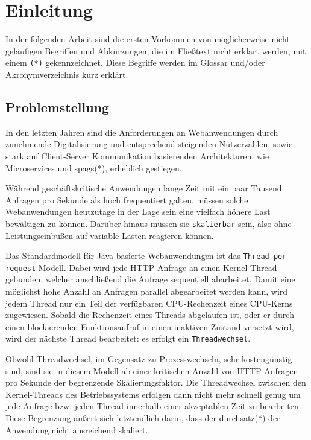 \section{Einleitung}
\label{sec:einleitung}
In der folgenden Arbeit sind die ersten Vorkommen von möglicherweise nicht geläufigen Begriffen und Abkürzungen, die
im Fließtext nicht erklärt werden, mit einem \verb|(*)| gekennzeichnet.
Diese Begriffe werden im Glossar und/oder Akronymverzeichnis kurz erklärt.

\subsection{Problemstellung}
\label{subsec:problemstellung}
In den letzten Jahren sind die Anforderungen an Webanwendungen durch zunehmende Digitalisierung und entsprechend steigenden Nutzerzahlen,
sowie stark auf Client-Server Kommunikation basierenden Architekturen, wie Microservices und \Glspl{spag}(*), erheblich gestiegen.

Während geschäftskritische Anwendungen lange Zeit mit ein paar Tausend Anfragen pro Sekunde als hoch frequentiert
galten, müssen solche Webanwendungen heutzutage in der Lage sein eine vielfach höhere Last bewältigen zu können.
Darüber hinaus müssen sie \verb|skalierbar| sein, also ohne Leistungseinbußen auf variable Lasten reagieren können.

Das Standardmodell für Java-basierte Webanwendungen ist das \verb|Thread per request|-Modell.
Dabei wird jede HTTP-Anfrage an einen Kernel-Thread gebunden, welcher anschließend die Anfrage sequentiell abarbeitet.
Damit eine möglichst hohe Anzahl an Anfragen parallel abgearbeitet werden kann, wird jedem Thread nur ein Teil der verfügbaren
CPU-Rechenzeit eines CPU-Kerns zugewiesen. Sobald die Rechenzeit eines Threads abgelaufen ist, oder er durch einen blockierenden
Funktionsaufruf in einen inaktiven Zustand versetzt wird, wird der nächste Thread bearbeitet: es erfolgt ein \verb|Threadwechsel|.

Obwohl Threadwechsel, im Gegensatz zu Prozesswechseln, sehr kostengünstig sind, sind sie in diesem Modell ab einer kritischen Anzahl von HTTP-Anfragen
pro Sekunde der begrenzende Skalierungsfaktor. Die Threadwechsel zwischen den Kernel-Threads des Betriebssystems erfolgen dann nicht mehr
schnell genug um jede Anfrage bzw. jeden Thread innerhalb einer akzeptablen Zeit zu bearbeiten.
Diese Begrenzung äußert sich letztendlich darin, dass der \Gls{durchsatz}(*) der Anwendung nicht ausreichend skaliert.

